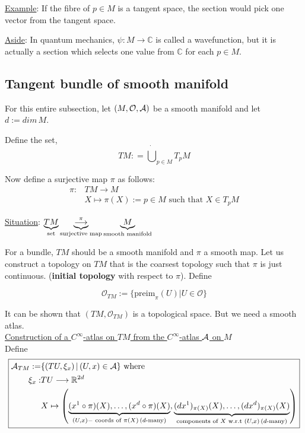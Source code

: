 \underline{Example}: If the fibre of $p \in M$ is a tangent space, the section would pick one vector from the tangent space.

\underline{Aside}: In quantum mechanics, $\psi : M \to \mathbb{C}$ is called a wavefunction, but it is actually a section which selects one value from $\mathbb{C}$ for each $p \in M$.


\subsection{Tangent bundle of smooth manifold}
For this entire subsection, let $(M, \mathcal{O}, \mathcal{A})$ be a smooth manifold and let $d := dim \, M$. 

Define the set, 
\begin{equation}
\boxed{TM : = \dot{\bigcup}_{p \in M} T_pM}
\end{equation}

Now define a surjective map $\pi$ as follows:
\begin{equation}
\boxed{\begin{split}
  \pi : & TM \to M \\
  & X \mapsto \pi(X) := p \in M \text{ such that } X \in T_pM
\end{split}}
\end{equation}

\underline{Situation}:  $\underbrace{TM}_{\text{set}} \underbrace{ \stackrel{\pi}{\longrightarrow}}_{\text{surjective map}} \underbrace{M}_{\text{smooth manifold}}$

For a bundle, $TM$ should be a smooth manifold and $\pi$ a smooth map. Let us construct a topology on $TM$ that is the coarsest topology such that $\pi$ is just continuous. (\textbf{initial topology} with respect to $\pi$). Define

\begin{equation}
\boxed{\mathcal{O}_{TM} := \lbrace \text{preim}_{\pi}(U) | U \in \mathcal{O} \rbrace}
\end{equation}

It can be shown that $(TM,\mathcal{O}_{TM})$ is a topological space. But we need a smooth atlas.\\

\underline{Construction of a $C^{\infty}$-atlas on $TM$ from the $C^{\infty}$-atlas $\mathcal{A}$ on $M$} \\
Define
\begin{equation}\label{eq:atlasTangentBundle}
\boxed{
\begin{split}
\mathcal{A}_{TM} := & \lbrace (TU,\xi_x) \, | \, (U,x) \in \mathcal{A} \rbrace \text{ where } \\
  \xi_x : & TU \longrightarrow \mathbb{R}^{2d} \\
  & X \mapsto \left(\underbrace{(x^1 \circ \pi)(X), \dotsc, (x^d \circ \pi)(X)}_{(U,x)-\text{ coords of } \pi(X) \, (d\text{-many})}, \underbrace{(dx^1)_{\pi(X)}(X), \dotsc, (dx^d)_{\pi(X)}(X)}_{\text{components of $X$ w.r.t } (U,x) \, (d\text{-many})}\right)
\end{split}
}
\end{equation}

